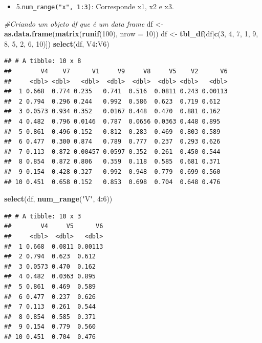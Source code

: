 \documentclass[]{book}
\newenvironment{Shaded}{\begin{snugshade}}{\end{snugshade}}
\newcommand{\CommentTok}[1]{\textcolor[rgb]{0.56,0.35,0.01}{\textit{#1}}}
\newcommand{\DataTypeTok}[1]{\textcolor[rgb]{0.13,0.29,0.53}{#1}}
\newcommand{\DecValTok}[1]{\textcolor[rgb]{0.00,0.00,0.81}{#1}}
\newcommand{\KeywordTok}[1]{\textcolor[rgb]{0.13,0.29,0.53}{\textbf{#1}}}
\newcommand{\NormalTok}[1]{#1}
\newcommand{\OperatorTok}[1]{\textcolor[rgb]{0.81,0.36,0.00}{\textbf{#1}}}
\newcommand{\StringTok}[1]{\textcolor[rgb]{0.31,0.60,0.02}{#1}}
\providecommand{\tightlist}{%
  \setlength{\itemsep}{0pt}\setlength{\parskip}{0pt}}
\begin{document}
\begin{itemize}
\tightlist
\item
  5.\texttt{num\_range("x",\ 1:3)}: Corresponde x1, x2 e x3.
\end{itemize}

\begin{Shaded}
\begin{Highlighting}[]
\CommentTok{#Criando um objeto df que é um data frame}
\NormalTok{df <-}\StringTok{ }\KeywordTok{as.data.frame}\NormalTok{(}\KeywordTok{matrix}\NormalTok{(}\KeywordTok{runif}\NormalTok{(}\DecValTok{100}\NormalTok{), }\DataTypeTok{nrow =} \DecValTok{10}\NormalTok{)) }
\NormalTok{df <-}\StringTok{ }\KeywordTok{tbl_df}\NormalTok{(df[}\KeywordTok{c}\NormalTok{(}\DecValTok{3}\NormalTok{, }\DecValTok{4}\NormalTok{, }\DecValTok{7}\NormalTok{, }\DecValTok{1}\NormalTok{, }\DecValTok{9}\NormalTok{, }\DecValTok{8}\NormalTok{, }\DecValTok{5}\NormalTok{, }\DecValTok{2}\NormalTok{, }\DecValTok{6}\NormalTok{, }\DecValTok{10}\NormalTok{)])}
\KeywordTok{select}\NormalTok{(df, V4}\OperatorTok{:}\NormalTok{V6)}
\end{Highlighting}
\end{Shaded}

\begin{verbatim}
## # A tibble: 10 x 8
##        V4    V7      V1     V9     V8     V5    V2      V6
##     <dbl> <dbl>   <dbl>  <dbl>  <dbl>  <dbl> <dbl>   <dbl>
##  1 0.668  0.774 0.235   0.741  0.516  0.0811 0.243 0.00113
##  2 0.794  0.296 0.244   0.992  0.586  0.623  0.719 0.612  
##  3 0.0573 0.934 0.352   0.0167 0.448  0.470  0.881 0.162  
##  4 0.482  0.796 0.0146  0.787  0.0656 0.0363 0.448 0.895  
##  5 0.861  0.496 0.152   0.812  0.283  0.469  0.803 0.589  
##  6 0.477  0.300 0.874   0.789  0.777  0.237  0.293 0.626  
##  7 0.113  0.872 0.00457 0.0597 0.352  0.261  0.450 0.544  
##  8 0.854  0.872 0.806   0.359  0.118  0.585  0.681 0.371  
##  9 0.154  0.428 0.327   0.992  0.948  0.779  0.699 0.560  
## 10 0.451  0.658 0.152   0.853  0.698  0.704  0.648 0.476
\end{verbatim}

\begin{Shaded}
\begin{Highlighting}[]
\KeywordTok{select}\NormalTok{(df, }\KeywordTok{num_range}\NormalTok{(}\StringTok{"V"}\NormalTok{, }\DecValTok{4}\OperatorTok{:}\DecValTok{6}\NormalTok{))}
\end{Highlighting}
\end{Shaded}

\begin{verbatim}
## # A tibble: 10 x 3
##        V4     V5      V6
##     <dbl>  <dbl>   <dbl>
##  1 0.668  0.0811 0.00113
##  2 0.794  0.623  0.612  
##  3 0.0573 0.470  0.162  
##  4 0.482  0.0363 0.895  
##  5 0.861  0.469  0.589  
##  6 0.477  0.237  0.626  
##  7 0.113  0.261  0.544  
##  8 0.854  0.585  0.371  
##  9 0.154  0.779  0.560  
## 10 0.451  0.704  0.476
\end{verbatim}
\end{document}
